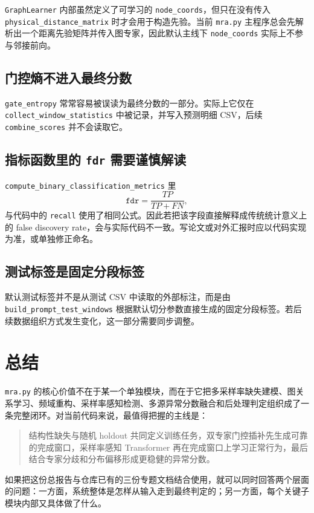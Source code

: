 \documentclass[UTF8]{ctexart}
\newcommand{\code}[1]{\texttt{#1}}
\begin{document}
\code{GraphLearner} 内部虽然定义了可学习的 \code{node\_coords}，但只在没有传入 \code{physical\_distance\_matrix} 时才会用于构造先验。当前 \code{mra.py} 主程序总会先解析出一个距离先验矩阵并传入图专家，因此默认主线下 \code{node\_coords} 实际上不参与邻接前向。

\subsection{门控熵不进入最终分数}

\code{gate\_entropy} 常常容易被误读为最终分数的一部分。实际上它仅在 \code{collect\_window\_statistics} 中被记录，并写入预测明细 CSV，后续 \code{combine\_scores} 并不会读取它。

\subsection{指标函数里的 \code{fdr} 需要谨慎解读}

\code{compute\_binary\_classification\_metrics} 里
\begin{equation}
    \texttt{fdr} = \frac{TP}{TP+FN},
\end{equation}
与代码中的 \code{recall} 使用了相同公式。因此若把该字段直接解释成传统统计意义上的 false discovery rate，会与实际代码不一致。写论文或对外汇报时应以代码实现为准，或单独修正命名。

\subsection{测试标签是固定分段标签}

默认测试标签并不是从测试 CSV 中读取的外部标注，而是由 \code{build\_prompt\_test\_windows} 根据默认切分参数直接生成的固定分段标签。若后续数据组织方式发生变化，这一部分需要同步调整。

\section{总结}

\code{mra.py} 的核心价值不在于某一个单独模块，而在于它把多采样率缺失建模、图关系学习、频域重构、采样率感知检测、多源异常分数融合和后处理判定组织成了一条完整闭环。对当前代码来说，最值得把握的主线是：
\begin{quote}
结构性缺失与随机 holdout 共同定义训练任务，双专家门控插补先生成可靠的完成窗口，采样率感知 Transformer 再在完成窗口上学习正常行为，最后结合专家分歧和分布偏移形成更稳健的异常分数。
\end{quote}

如果把这份总报告与仓库已有的三份专题文档结合使用，就可以同时回答两个层面的问题：一方面，系统整体是怎样从输入走到最终判定的；另一方面，每个关键子模块内部又具体做了什么。
\end{document}

